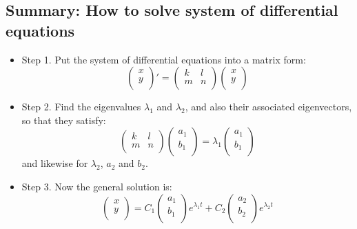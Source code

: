 \documentclass[12pt]{report}
\begin{document}
\subsection*{Summary: How to solve system of differential equations}

\begin{itemize}
\item Step 1. Put the system of differential equations into a matrix form:
$$\begin{pmatrix} x \\ y \\ \end{pmatrix}' = \begin{pmatrix} k & l \\ m & n \\ \end{pmatrix}  \begin{pmatrix} x \\ y \\ \end{pmatrix} $$
\item Step 2. Find the eigenvalues $\lambda_1$ and $\lambda_2$, and also their associated eigenvectors, so that they satisfy:
$$\begin{pmatrix} k & l \\ m & n \\ \end{pmatrix} \begin{pmatrix} a_1 \\ b_1\\ \end{pmatrix} = \lambda_1 \begin{pmatrix} a_1 \\ b_1\\ \end{pmatrix} $$
and likewise for $\lambda_2$, $a_2$ and $b_2$.
\item Step 3. Now the general solution is:
$$\begin{pmatrix} x \\ y \\ \end{pmatrix}  = C_1 \begin{pmatrix} a_1 \\ b_1 \\ \end{pmatrix} e^{\lambda_1 t} + C_2 \begin{pmatrix} a_2 \\ b_2 \\ \end{pmatrix} e^{\lambda_2 t} $$
\end{itemize}
\end{document}

